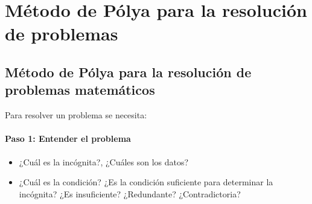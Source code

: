 \chapter{Método de Pólya para la resolución de problemas}
\label{Polya} 

\section{Método de Pólya para la resolución de problemas matemáticos}

\noindent Para resolver un problema se necesita:
\subsubsection*{Paso 1: Entender el problema}
\begin{itemize}
\item ¿Cuál es la incógnita?, ¿Cuáles son los datos?
\item ¿Cuál es la condición? ¿Es la condición suficiente para determinar la
  incógnita? ¿Es insuficiente? ¿Redundante? ¿Contradictoria? 
\end{itemize}

